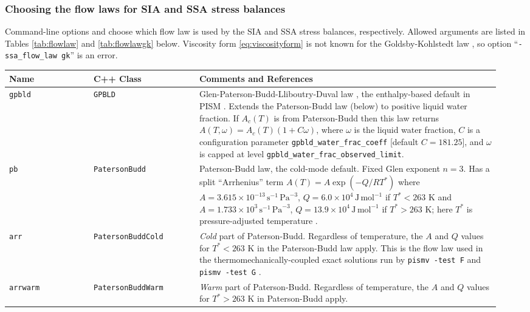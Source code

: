 \subsubsection*{Choosing the flow laws for SIA and SSA stress balances}  Command-line options  and  choose which flow law is used by the SIA and SSA stress balances, respectively.  Allowed arguments are listed in Tables \ref{tab:flowlaw} and \ref{tab:flowlawgk} below.  Viscosity form \eqref{eq:viscosityform} is not known for the Goldsby-Kohlstedt law \cite{GoldsbyKohlstedt}, so option ``\texttt{-ssa_flow_law gk}'' is an error.

\begin{table}[ht]
\centering
{}
\small
\begin{tabular}{p{0.16\linewidth}p{0.2\linewidth}p{0.58\linewidth}}\toprule
\textbf{Name} & C++ Class & \textbf{Comments and References} \\ \midrule
\texttt{gpbld} &\texttt{GPBLD}  & Glen-Paterson-Budd-Lliboutry-Duval law \cite{LliboutryDuval1985}, the enthalpy-based default in PISM \cite{AschwandenBuelerKhroulevBlatter}.  Extends the Paterson-Budd law (below) to positive liquid water fraction.  If $A_{c}(T)$ is from Paterson-Budd then this law returns $A(T,\omega) = A_{c}(T) (1 + C \omega)$, where $\omega$ is the liquid water fraction, $C$ is a configuration parameter \texttt{gpbld_water_frac_coeff} [default $C=181.25$], and $\omega$ is capped at level \texttt{gpbld_water_frac_observed_limit}.  \\  \midrule
\texttt{pb} &\texttt{PatersonBudd}  & Paterson-Budd law, the cold-mode default.  Fixed Glen exponent $n=3$.  Has a split ``Arrhenius'' term $A(T) = A \exp(-Q/RT^*)$ where \mbox{$A = 3.615 \times 10^{-13}\, \text{s}^{-1}\, \text{Pa}^{-3}$}, \mbox{$Q = 6.0 \times 10^4\, \text{J}\, \text{mol}^{-1}$} if $T^* < 263$ K and
 \mbox{$A = 1.733 \times 10^{3}\, \text{s}^{-1}\, \text{Pa}^{-3}$}, \mbox{$Q = 13.9 \times 10^4\, \text{J}\, \text{mol}^{-1}$} if $T^* > 263$ K; here $T^*$ is pressure-adjusted temperature \cite{PatersonBudd}. \\
\texttt{arr} &  \texttt{PatersonBuddCold} & \emph{Cold} part of Paterson-Budd.  Regardless of temperature, the $A$ and $Q$ values for $T^*<263$ K in  the Paterson-Budd law apply.  This is the flow law used in the thermomechanically-coupled exact solutions run by \texttt{pismv -test F} and \texttt{pismv -test G} \cite{BBL,BB}. \\
\texttt{arrwarm} & \texttt{PatersonBuddWarm} & \emph{Warm} part of Paterson-Budd.  Regardless of temperature, the $A$ and $Q$ values for $T^*>263$ K in Paterson-Budd apply.\\

\end{tabular}
\end{table}

